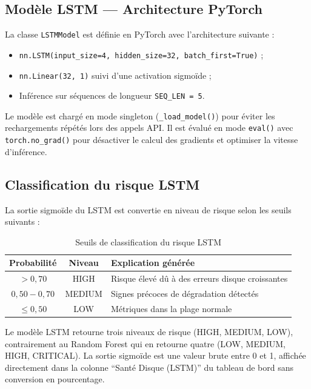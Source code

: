 \subsection{Modèle LSTM — Architecture PyTorch}

La classe \texttt{LSTMModel} est définie en PyTorch avec l'architecture suivante :

\begin{itemize}
  \item \texttt{nn.LSTM(input\_size=4, hidden\_size=32, batch\_first=True)} ;
  \item \texttt{nn.Linear(32, 1)} suivi d'une activation sigmoïde ;
  \item Inférence sur séquences de longueur \texttt{SEQ\_LEN = 5}.
\end{itemize}

Le modèle est chargé en mode singleton (\texttt{\_load\_model()}) pour éviter les
rechargements répétés lors des appels API. Il est évalué en mode \texttt{eval()} avec
\texttt{torch.no\_grad()} pour désactiver le calcul des gradients et optimiser la
vitesse d'inférence.

\subsection{Classification du risque LSTM}

La sortie sigmoïde du LSTM est convertie en niveau de risque selon les seuils suivants :

\begin{table}[H]
\centering
\caption{Seuils de classification du risque LSTM}
\begin{tabular}{|c|c|l|}
\hline
\rowcolor{lightblue}
\textbf{Probabilité} & \textbf{Niveau} & \textbf{Explication générée} \\
\hline
$> 0{,}70$ & HIGH & Risque élevé dû à des erreurs disque croissantes \\
\hline
$0{,}50 - 0{,}70$ & MEDIUM & Signes précoces de dégradation détectés \\
\hline
$\leq 0{,}50$ & LOW & Métriques dans la plage normale \\
\hline
\end{tabular}
\end{table}

Le modèle LSTM retourne trois niveaux de risque (HIGH, MEDIUM, LOW), contrairement au
Random Forest qui en retourne quatre (LOW, MEDIUM, HIGH, CRITICAL). La sortie sigmoïde
est une valeur brute entre 0 et 1, affichée directement dans la colonne
``Santé Disque (LSTM)'' du tableau de bord sans conversion en pourcentage.

